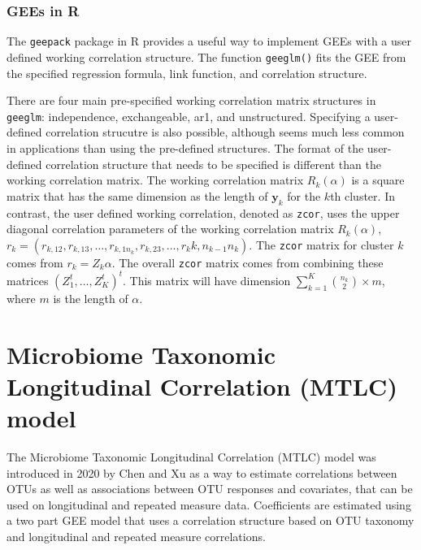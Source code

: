 \documentclass[12pt]{article}
\begin{document}
\subsubsection{GEEs in R}

The \texttt{geepack} package\cite{geepack} in R \cite{R} provides a useful way to implement GEEs with a user defined working correlation structure. The function \texttt{geeglm()} fits the GEE from the specified regression formula, link function, and correlation structure.

There are four main pre-specified working correlation matrix structures in \texttt{geeglm}: independence, exchangeable, ar1, and unstructured. Specifying a user-defined correlation strucutre is also possible, although seems much less common in applications than using the pre-defined structures. The format of the user-defined correlation structure that needs to be specified is different than the working correlation matrix. The working correlation matrix $R_k(\alpha)$ is a square matrix that has the same dimension as the length of $\mathbf{y}_k$ for the $k$th cluster. In contrast, the user defined working correlation, denoted as \texttt{zcor}, uses the upper diagonal correlation parameters of the working correlation matrix $R_{k}(\alpha)$, $r_k = (r_{k, 12}, r_{k,13}, \ldots , r_{k,1n_k}, r_{k,23}, \ldots , r_k{k,n_{k-1}n_k})$. The \texttt{zcor} matrix for cluster $k$ comes from $r_k = Z_k \alpha$. The overall \texttt{zcor} matrix comes from combining these matrices $(Z_1^t, \ldots , Z_K^t)^t$. This matrix will have dimension $\sum_{k=1}^K \binom{n_k}{2} \times m$, where $m$ is the length of $\alpha$.



\section{Microbiome Taxonomic Longitudinal Correlation (MTLC) model}

The Microbiome Taxonomic Longitudinal Correlation (MTLC) model was introduced in 2020 by Chen and Xu\cite{chen2020generalized} as a way to estimate correlations between OTUs as well as associations between OTU responses and covariates, that can be used on longitudinal and repeated measure data. Coefficients are estimated using a two part GEE model that uses a correlation structure based on OTU taxonomy and longitudinal and repeated measure correlations.
\end{document}

